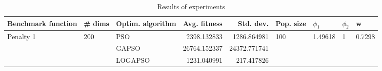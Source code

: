 \begin{table}
\centering
\caption{Results of experiments}
\begin{tabular}{lllrrllll}
\toprule
        Benchmark function &              \# dims & Optim. algorithm &  Avg. fitness &    Std. dev. &            Pop. size &               $\phi_{1}$ &         $\phi_{2}$ &                       w \\
\midrule
\multirow{3}{*}{Penalty 1} & \multirow{3}{*}{200} &              PSO &   2398.132833 &  1286.864981 & \multirow{3}{*}{100} & \multirow{3}{*}{1.49618} & \multirow{3}{*}{1} & \multirow{3}{*}{0.7298} \\
                           &                      &            GAPSO &  26764.152337 & 24372.771741 &                      &                          &                    &                         \\
                           &                      &          LOGAPSO &   1231.040991 &   217.417826 &                      &                          &                    &                         \\
\bottomrule
\end{tabular}
\end{table}
